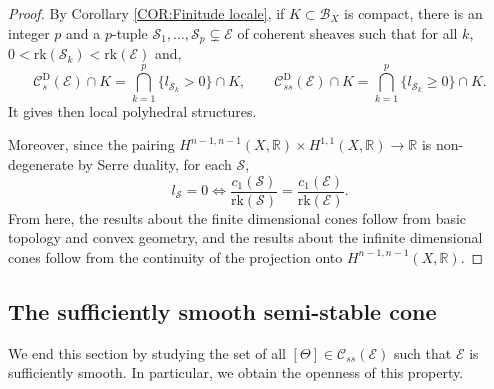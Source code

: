 \documentclass{article}
\theoremstyle{remark}
\theoremstyle{definition}
\newcommand{\R}{\mathbb{R}}
\newcommand{\rk}{\mathrm{rk}}
\newcommand{\E}{\mathcal{E}}
\newcommand{\mC}{\mathcal{C}}
\renewcommand{\geq}{\geqslant}
\begin{document}
\begin{proof}
By Corollary \ref{COR:Finitude locale}, if $K \subset \mathcal{B}_X$ is compact, there is an integer $p$ and a $p$-tuple $\mathcal{S}_1,\ldots,\mathcal{S}_p \subsetneq \E$ of coherent sheaves such that for all $k$, $0 < \rk(\mathcal{S}_k) < \rk(\E)$ and,
$$
\mC_s^{\mathrm{D}}(\E) \cap K = \bigcap_{k = 1}^p \{l_{\mathcal{S}_k} > 0\} \cap K, \qquad \mC_{ss}^{\mathrm{D}}(\E) \cap K = \bigcap_{k = 1}^p \{l_{\mathcal{S}_k} \geq 0\} \cap K.
$$
It gives then local polyhedral structures.

Moreover, since the pairing $H^{n - 1,n - 1}(X,\R) \times H^{1,1}(X,\R) \rightarrow \R$ is non-degenerate by Serre duality, for each $\mathcal{S}$,
$$
l_{\mathcal{S}} = 0 \Leftrightarrow \frac{c_1(\mathcal{S})}{\rk(\mathcal{S})} = \frac{c_1(\E)}{\rk(\E)}.
$$
From here, the results about the finite dimensional cones follow from basic topology and convex geometry, and the results about the infinite dimensional cones follow from the continuity of the projection onto $H^{n - 1,n - 1}(X,\R)$.
\end{proof}

\subsection{The sufficiently smooth semi-stable cone}

We end this section by studying the set of all $[\Theta] \in \mC_{ss}(\E)$ such that $\E$ is sufficiently smooth. In particular, we obtain the openness of this property.
\end{document}
